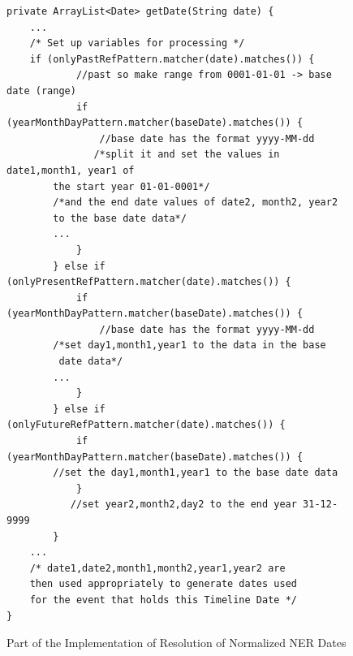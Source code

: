 \begin{figure}[H]
\begin{lstlisting}
private ArrayList<Date> getDate(String date) {
	...
	/* Set up variables for processing */
	if (onlyPastRefPattern.matcher(date).matches()) {
            //past so make range from 0001-01-01 -> base date (range)
            if (yearMonthDayPattern.matcher(baseDate).matches()) {
                //base date has the format yyyy-MM-dd
               /*split it and set the values in date1,month1, year1 of 
		the start year 01-01-0001*/
		/*and the end date values of date2, month2, year2 
		to the base date data*/
		...
            }
        } else if (onlyPresentRefPattern.matcher(date).matches()) {
            if (yearMonthDayPattern.matcher(baseDate).matches()) {
                //base date has the format yyyy-MM-dd
		/*set day1,month1,year1 to the data in the base
		 date data*/
		...
            }
        } else if (onlyFutureRefPattern.matcher(date).matches()) {
            if (yearMonthDayPattern.matcher(baseDate).matches()) {
		//set the day1,month1,year1 to the base date data
            }
           //set year2,month2,day2 to the end year 31-12-9999
        }
	...
	/* date1,date2,month1,month2,year1,year2 are 
	then used appropriately to generate dates used 
	for the event that holds this Timeline Date */
}
\end{lstlisting}
\caption{Part of the Implementation of Resolution of Normalized NER Dates}
\label{fig:refCode}
\end{figure}
